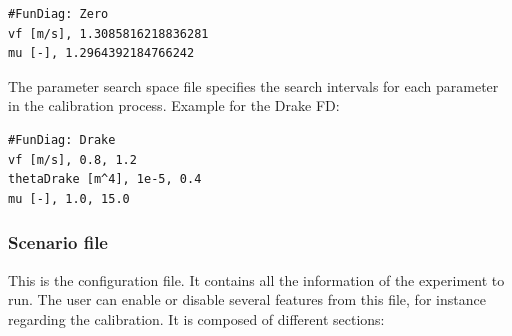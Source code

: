 \documentclass[a4paper,12pt]{article}
\begin{document}
\begin{lstlisting}[breaklines]
#FunDiag: Zero
vf [m/s], 1.3085816218836281
mu [-], 1.2964392184766242
\end{lstlisting}
The parameter search space file specifies the search intervals for each parameter in the calibration process.
\newline\newline
Example for the Drake FD: 

\begin{lstlisting}[breaklines]
#FunDiag: Drake
vf [m/s], 0.8, 1.2
thetaDrake [m^4], 1e-5, 0.4
mu [-], 1.0, 15.0
\end{lstlisting}

\subsubsection{Scenario file}

This is the configuration file. It contains all the information of the experiment to run. The user can enable or disable several features from this file, for instance regarding the calibration. It is composed of different sections: 
\end{document}
